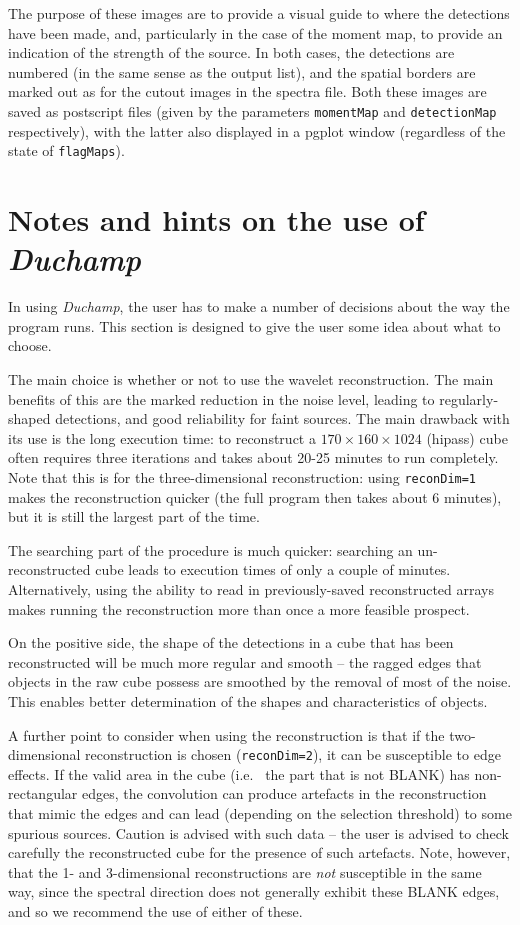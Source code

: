 \documentclass[12pt,a4paper]{article}
\newcommand{\ie}{i.e.\ }
\newcommand{\hipass}{{\sc hipass}}
\newcommand{\duchamp}{\emph{Duchamp}}
\begin{document}
The purpose of these images are to provide a visual guide to where the
detections have been made, and, particularly in the case of the moment
map, to provide an indication of the strength of the source. In both
cases, the detections are numbered (in the same sense as the output
list), and the spatial borders are marked out as for the cutout images
in the spectra file. Both these images are saved as postscript files
(given by the parameters \texttt{momentMap} and \texttt{detectionMap}
respectively), with the latter also displayed in a {\sc pgplot}
window (regardless of the state of \texttt{flagMaps}).

\section{Notes and hints on the use of \duchamp}
\label{sec-notes}

In using \duchamp, the user has to make a number of decisions about
the way the program runs. This section is designed to give the user
some idea about what to choose.

The main choice is whether or not to use the wavelet
reconstruction. The main benefits of this are the marked reduction in
the noise level, leading to regularly-shaped detections, and good
reliability for faint sources. The main drawback with its use is the
long execution time: to reconstruct a $170\times160\times1024$
(\hipass) cube often requires three iterations and takes about 20-25
minutes to run completely. Note that this is for the three-dimensional
reconstruction: using \texttt{reconDim=1} makes the reconstruction
quicker (the full program then takes about 6 minutes), but it is still
the largest part of the time.

The searching part of the procedure is much quicker: searching an
un-reconstructed cube leads to execution times of only a couple of
minutes. Alternatively, using the ability to read in previously-saved
reconstructed arrays makes running the reconstruction more than once a
more feasible prospect.

On the positive side, the shape of the detections in a cube that has
been reconstructed will be much more regular and smooth -- the ragged
edges that objects in the raw cube possess are smoothed by the removal
of most of the noise. This enables better determination of the shapes
and characteristics of objects.

A further point to consider when using the reconstruction is that if
the two-dimensional reconstruction is chosen (\texttt{reconDim=2}), it
can be susceptible to edge effects. If the valid area in the cube (\ie
the part that is not BLANK) has non-rectangular edges, the convolution
can produce artefacts in the reconstruction that mimic the edges and
can lead (depending on the selection threshold) to some spurious
sources. Caution is advised with such data -- the user is advised to
check carefully the reconstructed cube for the presence of such
artefacts. Note, however, that the 1- and 3-dimensional
reconstructions are \emph{not} susceptible in the same way, since the
spectral direction does not generally exhibit these BLANK edges, and
so we recommend the use of either of these.
\end{document}
